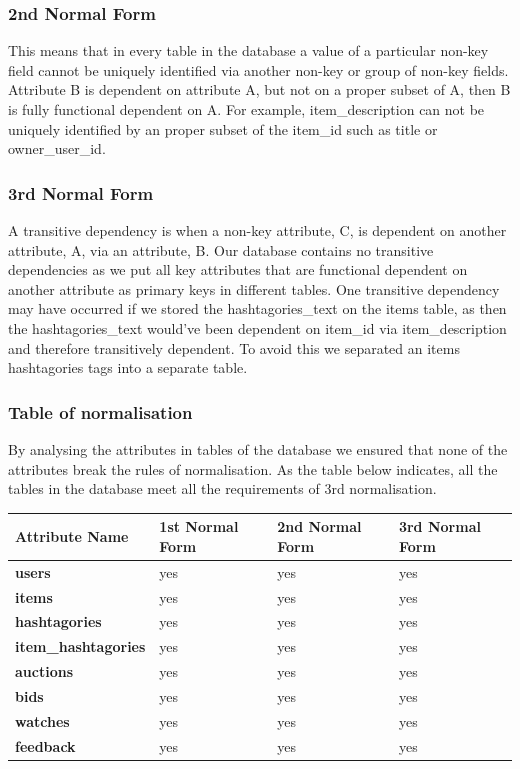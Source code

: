 \subsubsection{2nd Normal Form}\label{nd-normal-form}

This means that in every table in the database a value of a particular
non-key field cannot be uniquely identified via another non-key or group
of non-key fields. Attribute B is dependent on attribute A, but not on a
proper subset of A, then B is fully functional dependent on A. For
example, item\_description can not be uniquely identified by an proper
subset of the item\_id such as title or owner\_user\_id.

\subsubsection{3rd Normal Form}\label{rd-normal-form}

A transitive dependency is when a non-key attribute, C, is dependent on
another attribute, A, via an attribute, B. Our database contains no
transitive dependencies as we put all key attributes that are functional
dependent on another attribute as primary keys in different tables. One
transitive dependency may have occurred if we stored the
hashtagories\_text on the items table, as then the hashtagories\_text
would've been dependent on item\_id via item\_description and therefore
transitively dependent. To avoid this we separated an items hashtagories
tags into a separate table.

\subsubsection{Table of normalisation}\label{table-of-normalisation}

By analysing the attributes in tables of the database we ensured that
none of the attributes break the rules of normalisation. As the table
below indicates, all the tables in the database meet all the
requirements of 3rd normalisation.

\begin{longtable}[c]{@{}llll@{}}
\toprule
Attribute Name & 1st Normal Form & 2nd Normal Form & 3rd Normal
Form\tabularnewline
\midrule
\endhead
\textbf{users} & yes & yes & yes\tabularnewline
\textbf{items} & yes & yes & yes\tabularnewline
\textbf{hashtagories} & yes & yes & yes\tabularnewline
\textbf{item\_hashtagories} & yes & yes & yes\tabularnewline
\textbf{auctions} & yes & yes & yes\tabularnewline
\textbf{bids} & yes & yes & yes\tabularnewline
\textbf{watches} & yes & yes & yes\tabularnewline
\textbf{feedback} & yes & yes & yes\tabularnewline
\bottomrule
\end{longtable}

